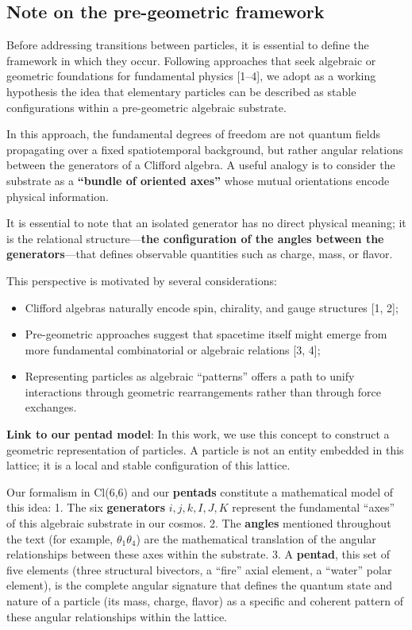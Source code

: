 \documentclass[11pt]{article}
\providecommand{\tightlist}{%
\setlength{\itemsep}{2pt}\setlength{\parskip}{6pt}
}
\begin{document}
\hypertarget{note-on-the-pre-geometric-framework}{%
\subsection{Note on the pre-geometric
framework}\label{note-on-the-pre-geometric-framework}}

Before addressing transitions between particles, it is essential to
define the framework in which they occur. Following approaches that seek
algebraic or geometric foundations for fundamental physics {[}1--4{]},
we adopt as a working hypothesis the idea that elementary particles can
be described as stable configurations within a pre-geometric algebraic
substrate.

In this approach, the fundamental degrees of freedom are not quantum
fields propagating over a fixed spatiotemporal background, but rather
angular relations between the generators of a Clifford algebra. A useful
analogy is to consider the substrate as a \textbf{``bundle of oriented
axes''} whose mutual orientations encode physical information.

It is essential to note that an isolated generator has no direct
physical meaning; it is the relational structure---\textbf{the
configuration of the angles between the generators}---that defines
observable quantities such as charge, mass, or flavor.

This perspective is motivated by several considerations:

\begin{itemize}
\tightlist
\item
  Clifford algebras naturally encode spin, chirality, and gauge
  structures {[}1, 2{]};
\item
  Pre-geometric approaches suggest that spacetime itself might emerge
  from more fundamental combinatorial or algebraic relations {[}3, 4{]};
\item
  Representing particles as algebraic ``patterns'' offers a path to
  unify interactions through geometric rearrangements rather than
  through force exchanges.
\end{itemize}

\textbf{Link to our pentad model}: In this work, we use this concept to
construct a geometric representation of particles. A particle is not an
entity embedded in this lattice; it is a local and stable configuration
of this lattice.

Our formalism in Cl(6,6) and our \textbf{pentads} constitute a
mathematical model of this idea: 1. The six \textbf{generators}
\(i,j,k,I,J,K\) represent the fundamental ``axes'' of this algebraic
substrate in our cosmos. 2. The \textbf{angles} mentioned throughout the
text (for example, \(\theta_1\theta_4\)) are the mathematical
translation of the angular relationships between these axes within the
substrate. 3. A \textbf{pentad}, this set of five elements (three
structural bivectors, a ``fire'' axial element, a ``water'' polar
element), is the complete angular signature that defines the quantum
state and nature of a particle (its mass, charge, flavor) as a specific
and coherent pattern of these angular relationships within the lattice.
\end{document}
